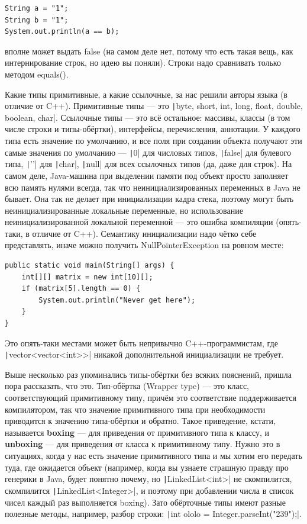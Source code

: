 \documentclass[a5paper]{article}
\begin{document}
\begin{verbatim}
String a = "1";
String b = "1";
System.out.println(a == b);
\end{verbatim}

вполне может выдать false (на самом деле нет, потому что есть такая вещь, как интернирование строк, но идею вы поняли). Строки надо сравнивать только методом equals().

Какие типы примитивные, а какие ссылочные, за нас решили авторы языка (в отличие от C++). Примитивные типы --- это \texttt|byte, short, int, long, float, double, boolean, char|. Ссылочные типы --- это всё остальное: массивы, классы (в том числе строки и типы-обёртки), интерфейсы, перечисления, аннотации. У каждого типа есть значение по умолчанию, и все поля при создании объекта получают эти самые значения по умолчанию --- \texttt|0| для числовых типов, \texttt|false| для булевого типа, \texttt|'\0'| для \texttt|char|, \texttt|null| для всех ссылочных типов (да, даже для строк). На самом деле, Java-машина при выделении памяти под объект просто заполняет всю память нулями всегда, так что неинициализированных переменных в Java не бывает. Она так не делает при инициализации кадра стека, поэтому могут быть неинициализированные локальные переменные, но использование неинициализированной локальной переменной --- это ошибка компиляции (опять-таки, в отличие от C++). Семантику инициализации надо чётко себе представлять, иначе можно получить NullPointerException на ровном месте:

\begin{verbatim}
public static void main(String[] args) {
    int[][] matrix = new int[10][];
    if (matrix[5].length == 0) {
        System.out.println("Never get here");
    }
}
\end{verbatim}

Это опять-таки местами может быть непривычно C++-программистам, где \texttt|vector<vector<int>>| никакой дополнительной инициализации не требует.

Выше несколько раз упоминались типы-обёртки без всяких пояснений, пришла пора рассказать, что это. Тип-обёртка (Wrapper type) --- это класс, соответствующий примитивному типу, причём это соответствие поддерживается компилятором, так что значение примитивного типа при необходимости приводится к значению типа-обёртки и обратно. Такое приведение, кстати, называется \textbf{boxing} --- для приведения от примитивного типа к классу, и \textbf{unboxing} --- для приведения от класса к примитивному типу. Нужно это в ситуациях, когда у нас есть значение примитивного типа и мы хотим его передать туда, где ожидается объект (например, когда вы узнаете страшную правду про генерики в Java, будет понятно почему, но \texttt|LinkedList<int>| не скомпилится, скомпилится \texttt|LinkedList<Integer>|, и поэтому при добавлении числа в список чисел каждый раз выполняется boxing). Зато обёрточные типы имеют разные полезные методы, например, разбор строки: \texttt|int ololo = Integer.parseInt("239");|.
\end{document}
